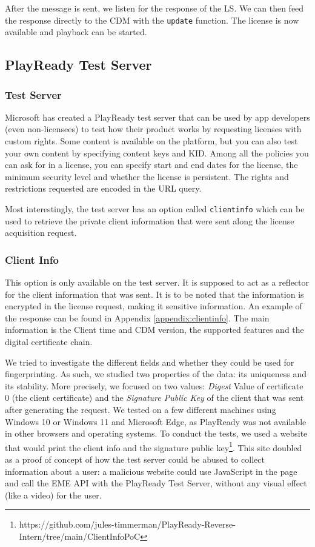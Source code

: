 \documentclass[11pt, a4paper]{IEEEtran}
\begin{document}
After the message is sent, we listen for the response of the LS. We can then feed the response directly to the CDM with the \texttt{update} function. The license is now available and playback can be started.


\subsection{PlayReady Test Server}

\subsubsection{Test Server}

Microsoft has created a PlayReady test server that can be used by app developers (even non-licensees) to test how their product works by requesting licenses with custom rights. Some content is available on the platform, but you can also test your own content by specifying content keys and KID. Among all the policies you can ask for in a license, you can specify start and end dates for the license, the minimum security level and whether the license is persistent. The rights and restrictions requested are encoded in the URL query.

Most interestingly, the test server has an option called \texttt{clientinfo} which can be used to retrieve the private client information that were sent along the license acquisition request.

\subsubsection{Client Info} \label{sec:clientinfo}

This option is only available on the test server. It is supposed to act as a reflector for the client information that was sent. It is to be noted that the information is encrypted in the license request, making it sensitive information. An example of the response can be found in Appendix \ref{appendix:clientinfo}. The main information is the Client time and CDM version, the supported features and the digital certificate chain. 

We tried to investigate the different fields and whether they could be used for fingerprinting. As such, we studied two properties of the data: its uniqueness and its stability. More precisely, we focused on two values: \emph{Digest} Value of certificate 0 (the client certificate) and the \emph{Signature Public Key} of the client that was sent after generating the request. We tested on a few different machines using Windows 10 or Windows 11 and Microsoft Edge, as PlayReady was not available in other browsers and operating systems. To conduct the tests, we used a website that would print the client info and the signature public key\footnote{https://github.com/jules-timmerman/PlayReady-Reverse-Intern/tree/main/ClientInfoPoC}. This site doubled as a proof of concept of how the test server could be abused to collect information about a user: a malicious website could 
use JavaScript in the page and call the EME API with the PlayReady Test Server, without any visual effect (like a video) for the user. 
\end{document}
